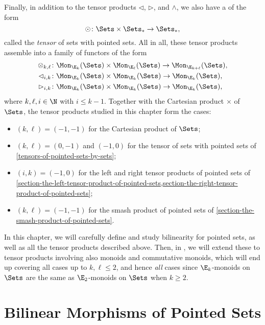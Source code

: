 Finally, in addition to the tensor products $\lhd$, $\rhd$, and $\wedge$, we also have a  of the form
\[
    \odot%
    \colon%
    \Sets\times\Sets_{*}%
    \to%
    \Sets_{*},%
\]%
called the \emph{tensor} of sets with pointed sets. All in all, these tensor products assemble into a family of functors of the form
\begin{align*}
    \otimes_{k,\ell} &\colon \Mon_{\E_{k}}(\Sets)\times\Mon_{\E_{\ell}}(\Sets) \to \Mon_{\E_{k+\ell}}(\Sets),\\%
    \lhd_{i,k}       &\colon \Mon_{\E_{k}}(\Sets)\times\Mon_{\E_{k}}(\Sets)    \to \Mon_{\E_{k}}(\Sets),\\%
    \rhd_{i,k}       &\colon \Mon_{\E_{k}}(\Sets)\times\Mon_{\E_{k}}(\Sets)    \to \Mon_{\E_{k}}(\Sets),%
\end{align*}
where $k,\ell,i\in\N$ with $i\leq k-1$. Together with the Cartesian product $\times$ of $\Sets$, the tensor products studied in this chapter form the cases:
\begin{itemize}
    \item $(k,\ell)=(-1,-1)$ for the Cartesian product of $\Sets$;
    \item $(k,\ell)=(0,-1)$ and $(-1,0)$ for the tensor of sets with pointed sets of \cref{tensors-of-pointed-sets-by-sets};
    \item $(i,k)=(-1,0)$ for the left and right tensor products of pointed sets of \cref{section-the-left-tensor-product-of-pointed-sets,section-the-right-tensor-product-of-pointed-sets};
    \item $(k,\ell)=(-1,-1)$ for the smash product of pointed sets of \cref{section-the-smash-product-of-pointed-sets}.
\end{itemize}
In this chapter, we will carefully define and study bilinearity for pointed sets, as well as all the tensor products described above. Then, in \ChapterTensorProductsOfMonoids, we will extend these to tensor products involving also monoids and commutative monoids, which will end up covering all cases up to $k,\ell\leq2$, and hence \emph{all} cases since $\E_{k}$-monoids on $\Sets$ are the same as $\E_{2}$-monoids on $\Sets$ when $k\geq2$.

\ChapterTableOfContents

\section{Bilinear Morphisms of Pointed Sets}\label{section-bilinear-morphisms-of-pointed-sets}
